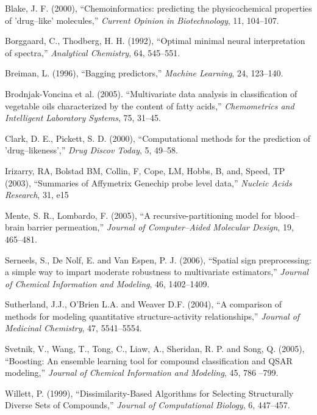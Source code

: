 \documentclass[12pt]{article}
\begin{document}
\begin{description}
   \item Blake, J. F. (2000), ``Chemoinformatics: predicting the physicochemical properties of 'drug--like' molecules,'' {\it Current Opinion in Biotechnology}, 11, 104--107.

   \item Borggaard, C., Thodberg, H. H. (1992), ``Optimal minimal neural interpretation of spectra,''  {\it Analytical Chemistry}, 64, 545--551.

   \item Breiman, L. (1996), ``Bagging predictors,'' {\it Machine Learning}, 24, 123--140.

	\item  Brodnjak-Voncina et al. (2005). ``Multivariate data analysis in classification of vegetable oils characterized
	by the content of fatty acids,'' {\it Chemometrics and Intelligent Laboratory Systems}, 75, 31--45.

   \item Clark, D. E., Pickett, S. D. (2000), ``Computational methods for the prediction of 'drug--likeness','' {\it Drug Discov Today}, 5, 49--58.

	\item Irizarry, RA, Bolstad BM, Collin, F, Cope, LM, Hobbs, B, and, Speed, TP (2003), ``Summaries of Affymetrix Genechip probe level data,''  {\it Nucleic Acids Research}, 31, e15

   \item Mente, S. R., Lombardo, F. (2005), ``A recursive-partitioning model for blood--brain barrier permeation,'' {\it Journal of Computer--Aided Molecular Design}, 19, 465--481.


   \item Serneels, S., De Nolf, E. and Van Espen, P. J. (2006), ``Spatial sign preprocessing: a simple way to impart moderate robustness to multivariate estimators,'' {\it Journal of Chemical Information and Modeling}, 46, 1402--1409.

   \item Sutherland, J.J., O'Brien L.A. and Weaver D.F. (2004), ``A comparison of methods for modeling quantitative structure-activity relationships,'' {\it Journal of Medicinal Chemistry}, 47, 5541--5554.

   \item Svetnik, V., Wang, T., Tong, C., Liaw, A., Sheridan, R. P. and Song, Q. (2005), ``Boosting: An ensemble learning tool for compound classification and QSAR modeling,'' {\it Journal of Chemical Information and Modeling}, 45, 786 --799.

   \item Willett, P. (1999), ``Dissimilarity-Based Algorithms for Selecting Structurally Diverse Sets of Compounds,'' {\it Journal of Computational Biology}, 6, 447--457.

\end{description}
\end{document}
